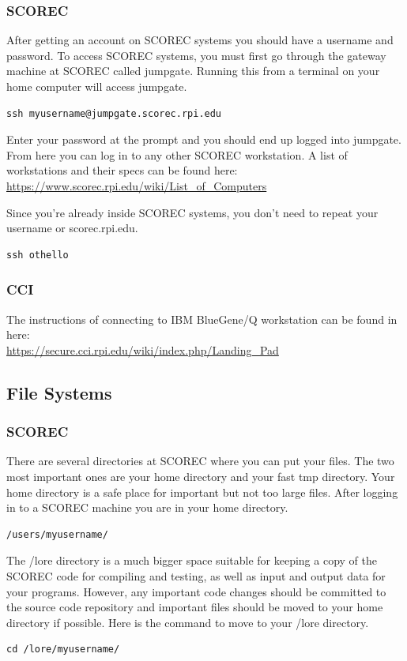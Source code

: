 \documentclass{article}
\begin{document}
\subsubsection{SCOREC}
After getting an account on SCOREC systems you should have a username and password. To access SCOREC systems, you must first go through the gateway machine at SCOREC called jumpgate. Running this from a terminal on your home computer will access jumpgate.
\begin{lstlisting}
ssh myusername@jumpgate.scorec.rpi.edu
\end{lstlisting}
Enter your password at the prompt and you should end up logged into jumpgate. From here you can log in to any other SCOREC workstation. A list of workstations and their specs can be found here:\\
\url{https://www.scorec.rpi.edu/wiki/List_of_Computers}

Since you're already inside SCOREC systems, you don't need to repeat your username or scorec.rpi.edu.

\begin{lstlisting}
ssh othello
\end{lstlisting}

\subsubsection{CCI}
The instructions of connecting to IBM BlueGene/Q workstation can be found in here: \\
\url{https://secure.cci.rpi.edu/wiki/index.php/Landing_Pad}

\subsection{File Systems}
\label{ch:1.2}
\subsubsection{SCOREC}
There are several directories at SCOREC where you can put your files. The two most important ones are your home directory and your fast tmp directory. Your home directory is a safe place for important but not too large files. After logging in to a SCOREC machine you are in your home directory.
\begin{lstlisting}
/users/myusername/
\end{lstlisting}
The /lore directory is a much bigger space suitable for keeping a copy of the SCOREC code for compiling and testing, as well as input and output data for your programs. However, any important code changes should be committed to the source code repository and important files should be moved to your home directory if possible. Here is the command to move to your /lore directory.
\begin{lstlisting}
cd /lore/myusername/
\end{lstlisting}
\end{document}
